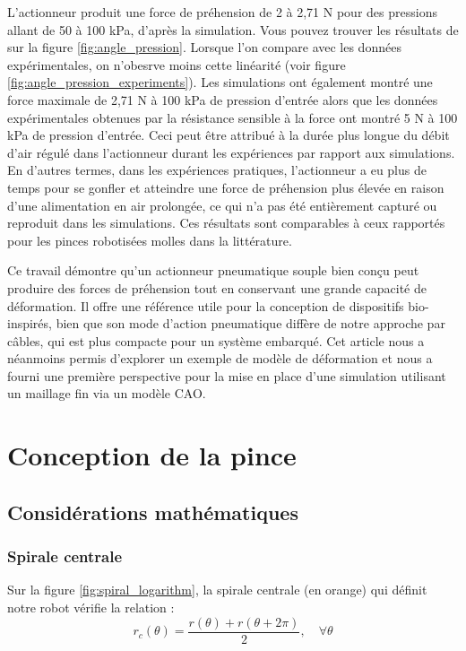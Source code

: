 \documentclass[a4paper, 11pt]{report}
\begin{document}
            L'actionneur produit une force de préhension de 2 à 2,71 N pour des pressions allant de 50 à 100 kPa, d'après la simulation. Vous pouvez trouver les résultats de sur la figure \ref{fig:angle_pression}. Lorsque l'on compare avec les données expérimentales, on n'obesrve moins cette linéarité (voir figure \ref{fig:angle_pression_experiments}). Les simulations ont également montré une force maximale de 2,71 N à 100 kPa de pression d'entrée alors que les données expérimentales obtenues par la résistance sensible à la force ont montré 5 N à 100 kPa de pression d'entrée. Ceci peut être attribué à la durée plus longue du débit d'air régulé dans l'actionneur durant les expériences par rapport aux simulations. En d'autres termes, dans les expériences pratiques, l'actionneur a eu plus de temps pour se gonfler et atteindre une force de préhension plus élevée en raison d'une alimentation en air prolongée, ce qui n'a pas été entièrement capturé ou reproduit dans les simulations. Ces résultats sont comparables à ceux rapportés pour les pinces robotisées molles dans la littérature. \cite{bhat_numerical_2025}

            Ce travail démontre qu'un actionneur pneumatique souple bien conçu peut produire des forces de préhension tout en conservant une grande capacité de déformation. Il offre une référence utile pour la conception de dispositifs bio-inspirés, bien que son mode d'action pneumatique diffère de notre approche par câbles, qui est plus compacte pour un système embarqué. Cet article nous a néanmoins permis d'explorer un exemple de modèle de déformation et nous a fourni une première perspective pour la mise en place d'une simulation utilisant un maillage fin via un modèle CAO.

\clearpage
        
\section{Conception de la pince}
        
    \subsection{Considérations mathématiques}

        \subsubsection{Spirale centrale}
            
            Sur la figure \ref{fig:spiral_logarithm}, la spirale centrale (en orange) qui définit notre robot vérifie la relation :
            \begin{equation}
            r_c(\theta) = \frac{r(\theta) + r(\theta + 2\pi)}{2}, \quad \forall \theta
            \label{eq:spirale_centrale}
            \end{equation}
            
\end{document}
